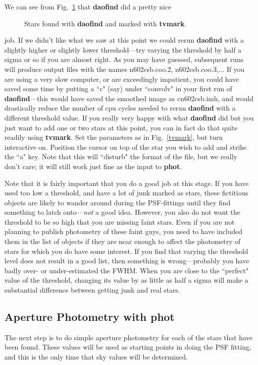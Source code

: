 We can see from Fig.~\ref{dots} that {\bf daofind} did a pretty nice
\begin{figure}
\vspace{7.0in}
\caption{\label{dots} Stars found with {\bf daofind} and marked with
{\bf tvmark}.}
\end{figure}
job.  If we didn't like what we saw at this point we could rerun
{\bf daofind} with a slightly higher or slightly lower threshold---try
varying the threshold by half a sigma or so if you are almost right.
As you may have guessed, subsequent runs will produce output files with
the names n602csb.coo.2, n602csb.coo.3,...
If you are using a very slow computer, or are exceedingly impatient,
 you could have saved some
time by putting a ``c" (say) under ``convolv" in your first run of
{\bf daofind}---this would have saved the
smoothed image as cn602csb.imh, and would drastically reduce
the number of cpu cycles needed to rerun {\bf daofind} with
a different threshold value.
If you really very happy with what {\bf daofind} did but you
just want to add one or two stars at this point, you
can in fact do that quite readily using {\bf tvmark}.  Set the
parameters as in Fig.~\ref{tvmark}, but turn interactive on.  
Position the cursor on top of the star you wish to add and strike
the ``a" key.  Note that this will ``disturb" the format of the file,
but we really don't care; it will still work just fine as the input to
{\bf phot}.
 
Note that it is fairly important that you do a good job at this stage.
If you have used too low a threshold, and have a lot of junk marked as
stars, these fictitious objects are likely to wander around during the
PSF-fittings until they find something to latch onto---{\it not} a good
idea.  However, you also do not want the threshold to be so high that
you are missing faint stars.  Even if you are not planning to publish
photometry of these faint guys, you need to have included them in the
list of objects if they are near enough to affect the photometry of
stars for which you do have some interest.  If you find that varying the
threshold level does not result in a good list, then something is
wrong---probably you have badly over- or under-estimated the FWHM.
When you are close to the ``perfect" value of the threshold, 
changing its value by as little as half a sigma will make a substantial
difference between getting junk and real stars.
 
\subsection{Aperture Photometry with {\bf phot} }
The next step is to do simple aperture photometry for each of the stars
that have been found.  These values will be used as starting points in
doing the PSF fitting, and this is the only time that sky values will be
determined.  
 
